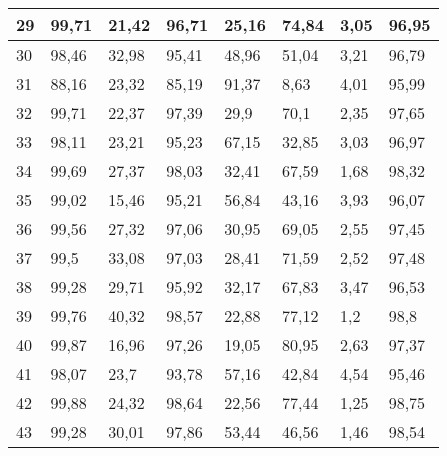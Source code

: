 \begin{longtable}[c]{|l|l|l|l|l|l|l|l|}
29              & 99,71        & 21,42        & 96,71       & 25,16         & 74,84         & 3,05          & 96,95         \\ \hline
30              & 98,46        & 32,98        & 95,41       & 48,96         & 51,04         & 3,21          & 96,79         \\ \hline
31              & 88,16        & 23,32        & 85,19       & 91,37         & 8,63          & 4,01          & 95,99         \\ \hline
32              & 99,71        & 22,37        & 97,39       & 29,9          & 70,1          & 2,35          & 97,65         \\ \hline
33              & 98,11        & 23,21        & 95,23       & 67,15         & 32,85         & 3,03          & 96,97         \\ \hline
34              & 99,69        & 27,37        & 98,03       & 32,41         & 67,59         & 1,68          & 98,32         \\ \hline
35              & 99,02        & 15,46        & 95,21       & 56,84         & 43,16         & 3,93          & 96,07         \\ \hline
36              & 99,56        & 27,32        & 97,06       & 30,95         & 69,05         & 2,55          & 97,45         \\ \hline
37              & 99,5         & 33,08        & 97,03       & 28,41         & 71,59         & 2,52          & 97,48         \\ \hline
38              & 99,28        & 29,71        & 95,92       & 32,17         & 67,83         & 3,47          & 96,53         \\ \hline
39              & 99,76        & 40,32        & 98,57       & 22,88         & 77,12         & 1,2           & 98,8          \\ \hline
40              & 99,87        & 16,96        & 97,26       & 19,05         & 80,95         & 2,63          & 97,37         \\ \hline
41              & 98,07        & 23,7         & 93,78       & 57,16         & 42,84         & 4,54          & 95,46         \\ \hline
42              & 99,88        & 24,32        & 98,64       & 22,56         & 77,44         & 1,25          & 98,75         \\ \hline
43              & 99,28        & 30,01        & 97,86       & 53,44         & 46,56         & 1,46          & 98,54         \\ \hline

\end{longtable}
